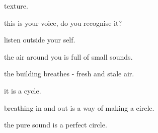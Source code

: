 \documentclass[extrafontsizes, 48pt]{memoir}
\newcommand\blankpage{%
    \null
    \thispagestyle{empty}%
    \addtocounter{page}{-1}%
    \newpage}
\begin{document}
	\begin{minipage}{.6\textwidth}
	texture.
	\afterpage{\blankpage}
	\end{minipage}
	\newpage

	\begin{minipage}{.6\textwidth}
	this is your voice, do you recognise it?
	\afterpage{\blankpage}
	\end{minipage}
	\newpage

	\begin{minipage}{.6\textwidth}
	listen outside your self.
	\end{minipage}
	\newpage

	\begin{minipage}{.6\textwidth}
	the air around you is full of small sounds.
	\end{minipage}
	\newpage

	\begin{minipage}{.6\textwidth}
	the building breathes - fresh and stale air.
	\end{minipage}
	\newpage

	\begin{minipage}{.6\textwidth}
	it is a cycle.
	\afterpage{\blankpage}
	\end{minipage}
	\newpage

	\begin{minipage}{.6\textwidth}
	breathing in and out is a way of making a circle.
	\afterpage{\blankpage}
	\end{minipage}
	\newpage

	\begin{minipage}{.6\textwidth}
	the pure sound is a perfect circle.
	\end{minipage}
	\newpage
\end{document}
